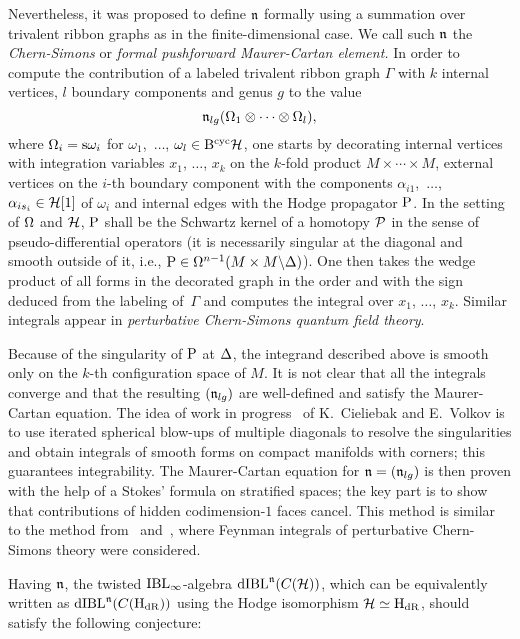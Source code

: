 \documentclass[\MainFolder/Text.tex]{subfiles}
\begin{document}
Nevertheless, it was proposed to define $\mathfrak{n}$ formally using a summation over trivalent ribbon graphs as in the finite-dimensional case.
We call such $\mathfrak{n}$ the \emph{Chern-Simons} or \emph{formal pushforward Maurer-Cartan element.} In order to compute the contribution of a labeled trivalent ribbon graph $\Gamma$ with $k$ internal vertices, $l$ boundary components and genus $g$ to the value
\[ \mathfrak{n}_{lg}(\Omega_1\otimes \dotsb \otimes \Omega_l), \]
where $\Omega_i = \mathrm{s} \omega_i$ for $\omega_1$,~$\dotsc$, $\omega_l \in \mathrm{B}^{\mathrm{cyc}}\mathcal{H}$, one starts by decorating internal vertices with integration variables $x_1$, $\dotsc$, $x_k$ on the $k$-fold product $M\times \dotsb \times M$, external vertices on the $i$-th boundary component with the components $\alpha_{i1}$,~$\dotsc$, $\alpha_{i s_i} \in\mathcal{H}[1]$ of $\omega_i$ and internal edges with the Hodge propagator $\mathrm{P}$.
In the setting of $\Omega$ and $\mathcal{H}$, $\mathrm{P}$ shall be the Schwartz kernel of a homotopy $\mathcal{P}$ in the sense of pseudo-differential operators (it is necessarily singular at the diagonal and smooth outside of it, i.e., $\mathrm{P} \in \Omega^{n-1}(M\times M \backslash \Delta)$).
One then takes the wedge product of all forms in the decorated graph in the order and with the sign deduced from the labeling of~$\Gamma$ and computes the integral over $x_1$, $\dotsc$, $x_k$.
Similar integrals appear in \emph{perturbative Chern-Simons quantum field theory}.


Because of the singularity of $\mathrm{P}$ at $\Delta$, the integrand described above is smooth only on the $k$-th configuration space of $M$.
It is not clear that all the integrals converge and that the resulting $(\mathfrak{n}_{lg})$ are well-defined and satisfy the Maurer-Cartan equation.
The idea of work in progress~\cite{Cieliebak2018} of K.~Cieliebak and E.~Volkov is to use iterated spherical blow-ups of multiple diagonals to resolve the singularities and obtain integrals of smooth forms on compact manifolds with corners; this guarantees integrability. The Maurer-Cartan equation for $\mathfrak{n} = (\mathfrak{n}_{lg})$ is then proven with the help of a Stokes' formula on stratified spaces; the key part is to show that contributions of hidden codimension-$1$ faces cancel. This method is similar to the method from~\cite{Axelrod1991} and~\cite{Axelrod1993}, where Feynman integrals of perturbative Chern-Simons theory were considered.

Having $\mathfrak{n}$, the twisted $\mathrm{IBL}_\infty$-algebra $\mathrm{dIBL}^{\mathfrak{n}}(C(\mathcal{H}))$, which can be equivalently written as $\mathrm{dIBL}^{\mathfrak{n}}(C(\mathrm{H}_{\mathrm{dR}}))$ using the Hodge isomorphism $\mathcal{H}\simeq \mathrm{H}_{\mathrm{dR}}$, should satisfy the following conjecture:
\end{document}
